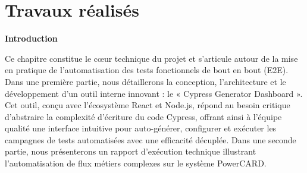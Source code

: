 \newpage
\chapter{Travaux réalisés}
\vspace{1cm}
\minitoc
\newpage

\textbf{Introduction}

Ce chapitre constitue le c\oe{}ur technique du projet et s'articule autour de la mise en pratique de l'automatisation des tests fonctionnels de bout en bout (E2E). Dans une première partie, nous détaillerons la conception, l'architecture et le développement d'un outil interne innovant : le « Cypress Generator Dashboard ». Cet outil, conçu avec l'écosystème React et Node.js, répond au besoin critique d'abstraire la complexité d'écriture du code Cypress, offrant ainsi à l'équipe qualité une interface intuitive pour auto-générer, configurer et exécuter les campagnes de tests automatisées avec une efficacité décuplée. Dans une seconde partie, nous présenterons un rapport d'exécution technique illustrant l'automatisation de flux métiers complexes sur le système PowerCARD.


\newpage


